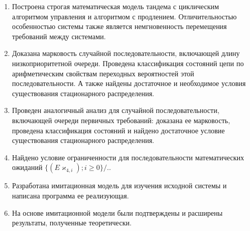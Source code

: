 \documentclass[a4paper,12pt,russian]{extarticle}
\begin{document}
    \begin{enumerate}
        \item Построена строгая математическая модель тандема с циклическим алгоритмом управления и алгоритмом с продлением. Отличительностью особенностью системы также является немгновенность перемещения требований между системами. 
        \item Доказана марковость случайной последовательности, включающей длину низкоприоритетной очереди. Проведена классификация состояний цепи по арифметическим свойствам переходных вероятностей этой последовательности. А также найдены достаточное и необходимое условия существования стационарного распределения.
        \item Проведен аналогичный анализ для случайной последовательности, включающей очереди первичных требований: доказана ее марковость, проведена классификация состояний и найдено достаточное условие существования стационарного распределения.
        \item Найдено условие ограниченности для последовательности математических ожиданий $    \{( E\varkappa_{4,i}); i \geqslant 0\}/. 
$.
        \item Разработана имитационная модель для изучения исходной системы и написана программа ее реализующая.
        \item На основе имитационной модели были подтверждены и расширены результаты, полученные теоретически.
    \end{enumerate}
\end{document}
